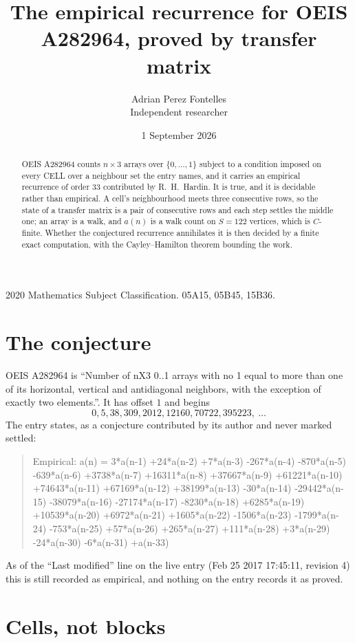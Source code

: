 \documentclass[11pt,a4paper]{article}
\title{The empirical recurrence for OEIS A282964, proved by transfer matrix}
\author{Adrian Perez Fontelles\\ \small Independent researcher}
\date{1 September 2026}
\theoremstyle{plain}
\theoremstyle{definition}
\begin{document}
\maketitle

\begin{abstract}
OEIS A282964 counts $n\times3$ arrays over $\{0,\dots,1\}$ subject to a condition imposed on
every CELL over a neighbour set the entry names, and it carries an empirical recurrence of
order $33$ contributed by R.~H.~Hardin. It is true, and it is decidable rather than
empirical. A cell's neighbourhood meets three consecutive rows, so the state of a transfer
matrix is a pair of consecutive rows and each step settles the middle one; an array is a
walk, and $a(n)$ is a walk count on $S=122$ vertices, which is $C$-finite. Whether the
conjectured recurrence annihilates it is then decided by a finite exact computation, with the
Cayley--Hamilton theorem bounding the work.
\end{abstract}

\noindent\small 2020 Mathematics Subject Classification. 05A15, 05B45, 15B36.\normalsize

\section{The conjecture}

OEIS A282964 is ``Number of nX3 0..1 arrays with no 1 equal to more than one of its horizontal, vertical and antidiagonal neighbors, with the exception of exactly two elements.''. It has offset $1$ and begins
\[
0, 5, 38, 309, 2012, 12160, 70722, 395223,\ \dots
\]
The entry states, as a conjecture contributed by its author and never marked settled:
\begin{quote}
Empirical: a(n) = 3*a(n-1) +24*a(n-2) +7*a(n-3) -267*a(n-4) -870*a(n-5) -639*a(n-6) +3738*a(n-7) +16311*a(n-8) +37667*a(n-9) +61221*a(n-10) +74643*a(n-11) +67169*a(n-12) +38199*a(n-13) -30*a(n-14) -29442*a(n-15) -38079*a(n-16) -27174*a(n-17) -8230*a(n-18) +6285*a(n-19) +10539*a(n-20) +6972*a(n-21) +1605*a(n-22) -1506*a(n-23) -1799*a(n-24) -753*a(n-25) +57*a(n-26) +265*a(n-27) +111*a(n-28) +3*a(n-29) -24*a(n-30) -6*a(n-31) +a(n-33)
\end{quote}
As of the ``Last modified'' line on the live entry (Feb 25 2017 17:45:11, revision 4) this is still
recorded as empirical, and nothing on the entry records it as proved.

\section{Cells, not blocks}
\end{document}

